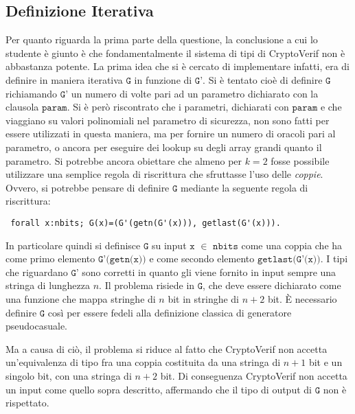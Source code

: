 \documentclass[a4paper,openright,twoside,12pt]{report}
\begin{document}
\subsection{Definizione Iterativa}
Per quanto riguarda la prima parte della questione, la conclusione a cui lo studente \`e giunto \`e che fondamentalmente il sistema di 
tipi di CryptoVerif non \`e abbastanza potente. La prima idea che si \`e cercato di implementare infatti, era di definire in 
maniera iterativa $\texttt{G}$ in funzione di $\texttt{G'}$. Si \`e tentato cio\`e di definire $\texttt{G}$ richiamando $\texttt{G'}$ 
un numero di volte pari ad un parametro dichiarato con la clausola $\texttt{param}$.
Si \`e per\`o riscontrato che i parametri, dichiarati con $\texttt{param}$ e che viaggiano su valori polinomiali nel parametro di sicurezza,
non sono fatti per essere utilizzati in questa maniera, ma per fornire un numero di oracoli pari al parametro, o ancora per
eseguire dei lookup su degli array grandi quanto il parametro.
Si potrebbe ancora obiettare che almeno per $k=2$ fosse possibile utilizzare una semplice regola di riscrittura che sfruttasse 
l'uso delle \emph{coppie}. Ovvero, si potrebbe pensare di definire $\texttt{G}$ mediante la seguente regola di riscrittura:
\begin{verbatim}
 forall x:nbits; G(x)=(G'(getn(G'(x))), getlast(G'(x))).
\end{verbatim}
In particolare quindi si definisce $\texttt{G}$ su input $\texttt{x
}$ $\in$ $\texttt{nbits}$ come una coppia che ha come primo elemento 
$\texttt{G'(getn(x))}$ e come secondo elemento $\texttt{getlast(G'(x))}$. I tipi che riguardano $\texttt{G'}$ sono corretti in quanto 
gli viene fornito in input sempre una stringa di lunghezza $n$. Il problema risiede in $\texttt{G}$, che deve essere dichiarato come una 
funzione che mappa stringhe di $n$ bit in stringhe di $n+2$ bit. \`E necessario definire $\texttt{G}$ cos\`i per essere fedeli 
alla definizione classica di generatore pseudocasuale.


Ma a causa di ci\`o, il problema si riduce al fatto che CryptoVerif non accetta un'equivalenza di tipo fra una coppia costituita da una stringa
di $n+1$ bit e un singolo bit, con una stringa di $n+2$ bit. Di conseguenza CryptoVerif non accetta un input come quello sopra descritto,
affermando che il tipo di output di $\texttt{G}$ non \`e rispettato.
\end{document}
